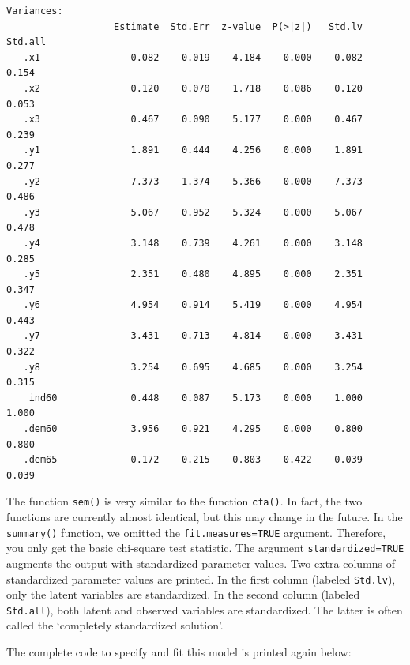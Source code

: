 \begin{verbatim}
Variances:
                   Estimate  Std.Err  z-value  P(>|z|)   Std.lv  Std.all
   .x1                0.082    0.019    4.184    0.000    0.082    0.154
   .x2                0.120    0.070    1.718    0.086    0.120    0.053
   .x3                0.467    0.090    5.177    0.000    0.467    0.239
   .y1                1.891    0.444    4.256    0.000    1.891    0.277
   .y2                7.373    1.374    5.366    0.000    7.373    0.486
   .y3                5.067    0.952    5.324    0.000    5.067    0.478
   .y4                3.148    0.739    4.261    0.000    3.148    0.285
   .y5                2.351    0.480    4.895    0.000    2.351    0.347
   .y6                4.954    0.914    5.419    0.000    4.954    0.443
   .y7                3.431    0.713    4.814    0.000    3.431    0.322
   .y8                3.254    0.695    4.685    0.000    3.254    0.315
    ind60             0.448    0.087    5.173    0.000    1.000    1.000
   .dem60             3.956    0.921    4.295    0.000    0.800    0.800
   .dem65             0.172    0.215    0.803    0.422    0.039    0.039
\end{verbatim}

The function \texttt{sem()} is very similar to the function
\texttt{cfa()}. In fact, the two functions are currently almost
identical, but this may change in the future. In the \texttt{summary()}
function, we omitted the \texttt{fit.measures=TRUE} argument. Therefore,
you only get the basic chi-square test statistic. The argument
\texttt{standardized=TRUE} augments the output with standardized
parameter values. Two extra columns of standardized parameter values are
printed. In the first column (labeled \texttt{Std.lv}), only the latent
variables are standardized. In the second column (labeled
\texttt{Std.all}), both latent and observed variables are standardized.
The latter is often called the `completely standardized solution'.

The complete code to specify and fit this model is printed again below:

\begin{Shaded}
\begin{Highlighting}[]
\StringTok{ }
\NormalTok{)}
\end{Highlighting}
\end{Shaded}

